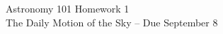 \documentclass[12pt]{article}
\newcommand{\BS}{\bigskip}
\begin{document}
\newpage


\begin{center}
	\sc \Large Astronomy 101 Homework 1 \\ \large The Daily Motion of the Sky -- Due September 8
\end{center}
%
%
%
\end{document}
